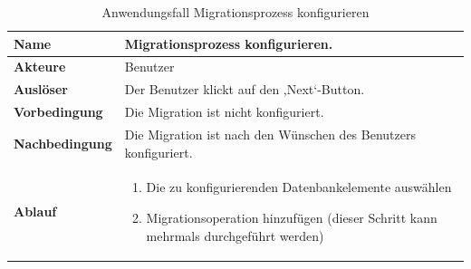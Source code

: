 \begin{table}[H]
	\centering
	\caption{Anwendungsfall Migrationsprozess konfigurieren}
	\begin{tabular}{ |p{4cm}|p{8cm}| }
		\hline
		\textbf{Name} &  Migrationsprozess konfigurieren. \\
		\hline
		\textbf{Akteure} & Benutzer  \\
		\hline
		\textbf{Auslöser} & Der Benutzer klickt auf den ,Next‘-Button.  \\
		\hline
		\textbf{Vorbedingung} &  Die Migration ist nicht konfiguriert. \\
		\hline
		\textbf{Nachbedingung} &  Die Migration ist nach den Wünschen des Benutzers konfiguriert. \\
		\hline
		\textbf{Ablauf} & 
		\begin{enumerate}
			\item Die zu konfigurierenden Datenbankelemente auswählen
			\item Migrationsoperation hinzufügen (dieser Schritt kann mehrmals durchgeführt werden)
		\end{enumerate}   \\
		\hline
		
	\end{tabular}
	\label{table:migration-cfg}
\end{table}



